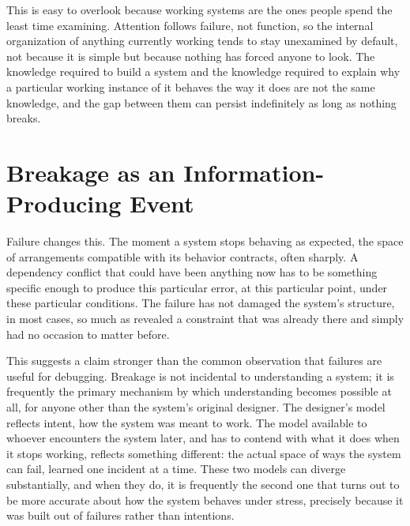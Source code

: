 \documentclass[11pt]{article}
\begin{document}
This is easy to overlook because working systems are the ones people spend the least time examining. Attention follows failure, not function, so the internal organization of anything currently working tends to stay unexamined by default, not because it is simple but because nothing has forced anyone to look. The knowledge required to build a system and the knowledge required to explain why a particular working instance of it behaves the way it does are not the same knowledge, and the gap between them can persist indefinitely as long as nothing breaks.

\section{Breakage as an Information-Producing Event}

Failure changes this. The moment a system stops behaving as expected, the space of arrangements compatible with its behavior contracts, often sharply. A dependency conflict that could have been anything now has to be something specific enough to produce this particular error, at this particular point, under these particular conditions. The failure has not damaged the system's structure, in most cases, so much as revealed a constraint that was already there and simply had no occasion to matter before.

This suggests a claim stronger than the common observation that failures are useful for debugging. Breakage is not incidental to understanding a system; it is frequently the primary mechanism by which understanding becomes possible at all, for anyone other than the system's original designer. The designer's model reflects intent, how the system was meant to work. The model available to whoever encounters the system later, and has to contend with what it does when it stops working, reflects something different: the actual space of ways the system can fail, learned one incident at a time. These two models can diverge substantially, and when they do, it is frequently the second one that turns out to be more accurate about how the system behaves under stress, precisely because it was built out of failures rather than intentions.
\end{document}
